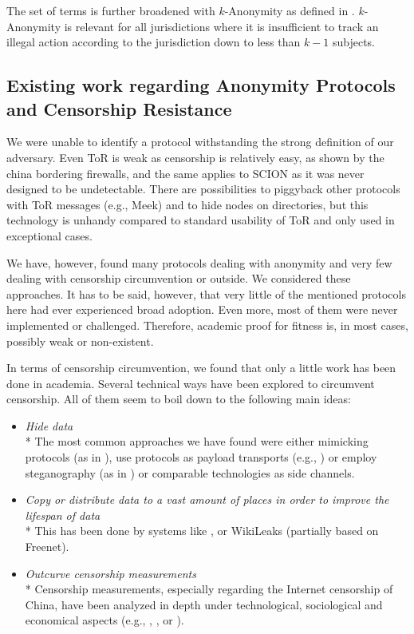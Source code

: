 \documentclass[acmsmall, screen, review]{acmart}
\begin{document}
	The set of terms is further broadened with $k$-Anonymity as defined in \cite{k-anonymous:ccs2003}. $k$-Anonymity is relevant for all jurisdictions where it is insufficient to track an illegal action according to the jurisdiction down to less than $k-1$ subjects.
	
	\subsection{Existing work regarding Anonymity Protocols and Censorship Resistance}
	We were unable to identify a protocol withstanding the strong definition of our adversary. Even ToR is weak as censorship is relatively easy, as shown by the china bordering firewalls, and the same applies to SCION as it was never designed to be undetectable. There are possibilities to piggyback other protocols with ToR messages (e.g., Meek) and to hide nodes on directories, but this technology is unhandy compared to standard usability of ToR and only used in exceptional cases. 
	
	We have, however, found many protocols dealing with anonymity and very few dealing with censorship circumvention or outside. We considered these approaches. It has to be said, however, that very little of the mentioned protocols here had ever experienced broad adoption. Even more, most of them were never implemented or challenged. Therefore, academic proof for fitness is, in most cases, possibly weak or non-existent.
	
	In terms of censorship circumvention, we found that only a little work has been done in academia. Several technical ways have been explored to circumvent censorship. All of them seem to boil down to the following main ideas:
	\begin{itemize}
		\item \emph{Hide data}\\*
		The most common approaches we have found were either mimicking protocols (as in \cite{mohajeri2013skypemorph}), use protocols as payload transports (e.g., \cite{AthanRAM07}) or employ steganography (as in \cite{f5}) or comparable technologies as side channels.
		\item \emph{Copy or distribute data to a vast amount of places in order to improve the lifespan of data}\\*
		This has been done by systems like \cite{freenet}, or WikiLeaks (partially based on Freenet).
		\item \emph{Outcurve censorship measurements}\\*
		Censorship measurements, especially regarding the Internet censorship of China, have been analyzed in depth under technological, sociological and economical aspects (e.g., \cite{Ensafi:2015}, \cite{Clayton:2006}, or \cite{lowe2007great}).
	\end{itemize}
	
\end{document}
